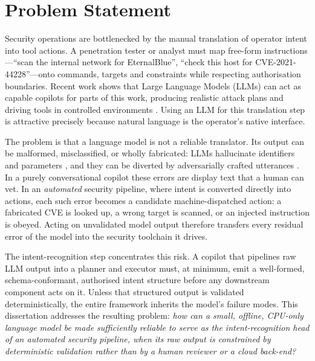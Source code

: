 \section{Problem Statement}\label{sec:problem-statement}

Security operations are bottlenecked by the manual translation of operator intent
into tool actions. A penetration tester or analyst must map free-form
instructions---``scan the internal network for EternalBlue'', ``check this host
for CVE-2021-44228''---onto commands, targets and constraints while respecting
authorisation boundaries. Recent work shows that Large Language Models (LLMs) can
act as capable copilots for parts of this work, producing realistic attack plans
and driving tools in controlled environments \parencite{deng2024pentestgpt,
happe2023pwned}. Using an LLM for this translation step is attractive precisely
because natural language is the operator's native interface.

The problem is that a language model is not a reliable translator. Its output can
be malformed, misclassified, or wholly fabricated: LLMs hallucinate identifiers
and parameters \parencite{ji2023hallucination}, and they can be diverted by
adversarially crafted utterances \parencite{greshake2023indirect,
liu2023promptinjection}. In a purely conversational copilot these errors are
display text that a human can vet. In an \emph{automated} security pipeline,
where intent is converted directly into actions, each such error becomes a
candidate machine-dispatched action: a fabricated CVE is looked up, a wrong
target is scanned, or an injected instruction is obeyed. Acting on unvalidated
model output therefore transfers every residual error of the model into the
security toolchain it drives.

The intent-recognition step concentrates this risk. A copilot that pipelines raw
LLM output into a planner and executor must, at minimum, emit a well-formed,
schema-conformant, authorised intent structure before any downstream component
acts on it. Unless that structured output is validated deterministically, the
entire framework inherits the model's failure modes. This dissertation addresses
the resulting problem: \emph{how can a small, offline, CPU-only language model be
made sufficiently reliable to serve as the intent-recognition head of an
automated security pipeline, when its raw output is constrained by deterministic
validation rather than by a human reviewer or a cloud back-end?}